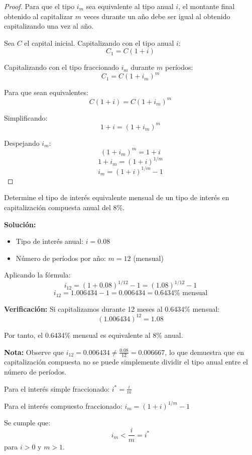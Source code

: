 \begin{proof}
Para que el tipo $i_m$ sea equivalente al tipo anual $i$, el montante final obtenido al capitalizar $m$ veces durante un año debe ser igual al obtenido capitalizando una vez al año.

Sea $C$ el capital inicial. Capitalizando con el tipo anual $i$:
$$C_1 = C(1 + i)$$

Capitalizando con el tipo fraccionado $i_m$ durante $m$ períodos:
$$C_1 = C(1 + i_m)^m$$

Para que sean equivalentes:
$$C(1 + i) = C(1 + i_m)^m$$

Simplificando:
$$1 + i = (1 + i_m)^m$$

Despejando $i_m$:
$$(1 + i_m)^m = 1 + i$$
$$1 + i_m = (1 + i)^{1/m}$$
$$i_m = (1 + i)^{1/m} - 1$$
\end{proof}

\begin{ejemplo}
Determine el tipo de interés equivalente mensual de un tipo de interés en capitalización compuesta anual del 8\%.

\textbf{Solución:}
\begin{itemize}
\item Tipo de interés anual: $i = 0.08$
\item Número de períodos por año: $m = 12$ (mensual)
\end{itemize}

Aplicando la fórmula:
$$i_{12} = (1 + 0.08)^{1/12} - 1 = (1.08)^{1/12} - 1$$
$$i_{12} = 1.006434 - 1 = 0.006434 = 0.6434\%\text{ mensual}$$

\textbf{Verificación:}
Si capitalizamos durante 12 meses al 0.6434\% mensual:
$$(1.006434)^{12} = 1.08$$

Por tanto, el 0.6434\% mensual es equivalente al 8\% anual.

\textbf{Nota:} Observe que $i_{12} = 0.006434 \neq \frac{0.08}{12} = 0.006667$, lo que demuestra que en capitalización compuesta no se puede simplemente dividir el tipo anual entre el número de períodos.
\end{ejemplo}

\begin{proposicion}
Para el interés simple fraccionado: $i^* = \frac{i}{m}$

Para el interés compuesto fraccionado: $i_m = (1 + i)^{1/m} - 1$

Se cumple que:
\begin{equation}
i_m < \frac{i}{m} = i^*
\end{equation}
para $i > 0$ y $m > 1$.
\end{proposicion}

